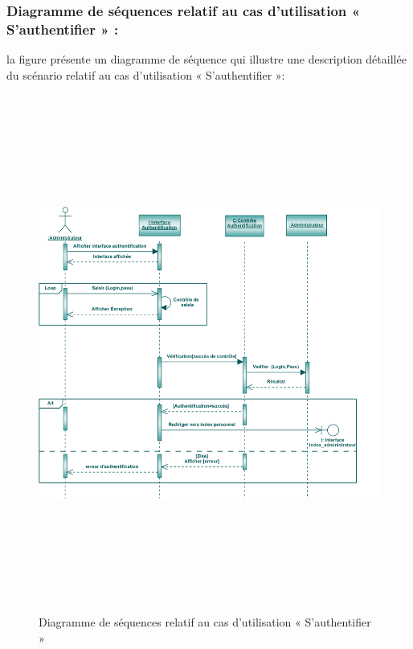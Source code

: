 \documentclass[12 pt]{report}
\begin{document}
\subsubsection{Diagramme de séquences relatif au cas d’utilisation « S’authentifier » :}
la figure   présente un diagramme de séquence qui illustre une description détaillée du scénario relatif au cas d’utilisation « S’authentifier »: 
{\begin{figure}[h]
 \begin{center}
\includegraphics[width= 18 cm ,height=  17cm]{ca.PNG}
\caption{Diagramme de séquences relatif au cas d’utilisation « S’authentifier »}

\end{center}
\end{figure}}
\newpage
\end{document}
